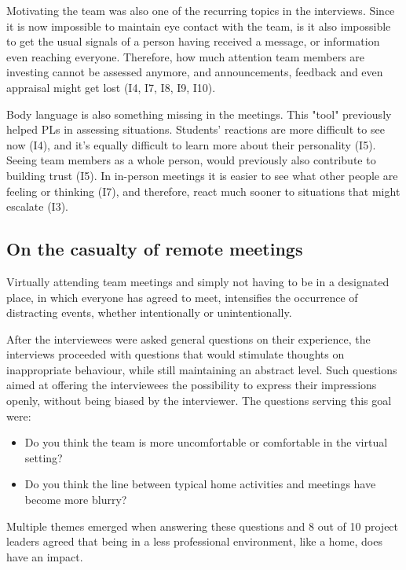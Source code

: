 Motivating the team was also one of the recurring topics in the interviews. Since it is now impossible to maintain eye contact with the team, is it also impossible to get the usual signals of a person having received a message, or information even reaching everyone. Therefore, how much attention team members are investing cannot be assessed anymore, and announcements, feedback and even appraisal might get lost (I4, I7, I8, I9, I10).

Body language is also something missing in the meetings. This "tool" previously helped PLs in assessing situations. Students' reactions are more difficult to see now (I4), and it's equally difficult to learn more about their personality (I5). Seeing team members as a whole person, would previously also contribute to building trust (I5). In in-person meetings it is easier to see what other people are feeling or thinking (I7), and therefore, react much sooner to situations that might escalate (I3).

\subsection{On the casualty of remote meetings}

Virtually attending team meetings and simply not having to be in a designated place, in which everyone has agreed to meet, intensifies the occurrence of distracting events, whether intentionally or unintentionally. 

After the interviewees were asked general questions on their experience, the interviews proceeded with questions that would stimulate thoughts on inappropriate behaviour, while still maintaining an abstract level. Such questions aimed at offering the interviewees the possibility to express their impressions openly, without being biased by the interviewer. The questions serving this goal were:

\begin{itemize}
\item Do you think the team is more uncomfortable or comfortable in the virtual setting?
\item Do you think the line between typical home activities and meetings have become more blurry?
\end{itemize}

Multiple themes emerged when answering these questions and 8 out of 10 project leaders agreed that being in a less professional environment, like a home, does have an impact.

